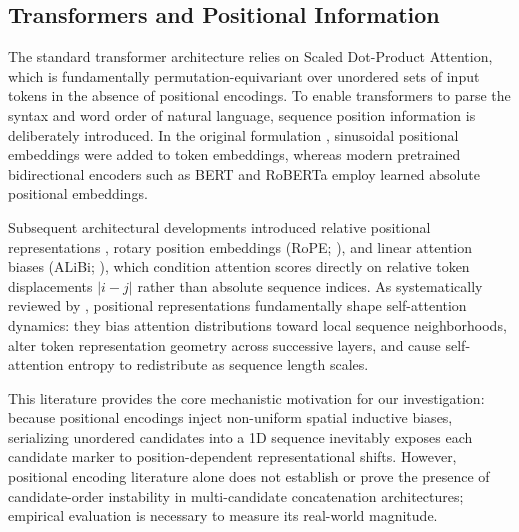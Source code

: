 \documentclass[10pt]{article}
\begin{document}
\subsection{Transformers and Positional Information}
The standard transformer architecture \citep{vaswani2017attention} relies on Scaled Dot-Product Attention, which is fundamentally permutation-equivariant over unordered sets of input tokens in the absence of positional encodings. To enable transformers to parse the syntax and word order of natural language, sequence position information is deliberately introduced. In the original formulation \citep{vaswani2017attention}, sinusoidal positional embeddings were added to token embeddings, whereas modern pretrained bidirectional encoders such as BERT and RoBERTa \citep{liu2019roberta} employ learned absolute positional embeddings.

Subsequent architectural developments introduced relative positional representations \citep{shaw2018self}, rotary position embeddings (RoPE; \citealp{su2024roformer}), and linear attention biases (ALiBi; \citealp{press2022alibi}), which condition attention scores directly on relative token displacements $|i - j|$ rather than absolute sequence indices. As systematically reviewed by \citet{dufter2022position}, positional representations fundamentally shape self-attention dynamics: they bias attention distributions toward local sequence neighborhoods, alter token representation geometry across successive layers, and cause self-attention entropy to redistribute as sequence length scales.

This literature provides the core mechanistic motivation for our investigation: because positional encodings inject non-uniform spatial inductive biases, serializing unordered candidates into a 1D sequence inevitably exposes each candidate marker to position-dependent representational shifts. However, positional encoding literature alone does not establish or prove the presence of candidate-order instability in multi-candidate concatenation architectures; empirical evaluation is necessary to measure its real-world magnitude.
\end{document}
